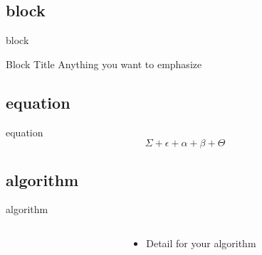 \documentclass{beamer}
\begin{document}
\subsection{block}
\begin{frame}{block}
  \begin{block}{Block Title}
    Anything you want to emphasize
  \end{block}
\end{frame}

\subsection{equation}
\begin{frame}{equation}
  \begin{equation}
    \Sigma + \epsilon + \alpha + \beta + \Theta
  \end{equation}
\end{frame}

\subsection{algorithm}
\begin{frame}{algorithm}
  \begin{columns}
    \begin{column}{0.5\textwidth}
      \begin{algorithm}[H]
        \LinesNumbered
        \caption{\tiny{Algorithm Title}}
        \label{alg:A}
        \tiny
      \end{algorithm}
    \end{column}

    \begin{column}{0.5\textwidth}
      \begin{itemize}
        \item Detail for your algorithm
      \end{itemize}
    \end{column}
  \end{columns}
\end{frame}
\end{document}
